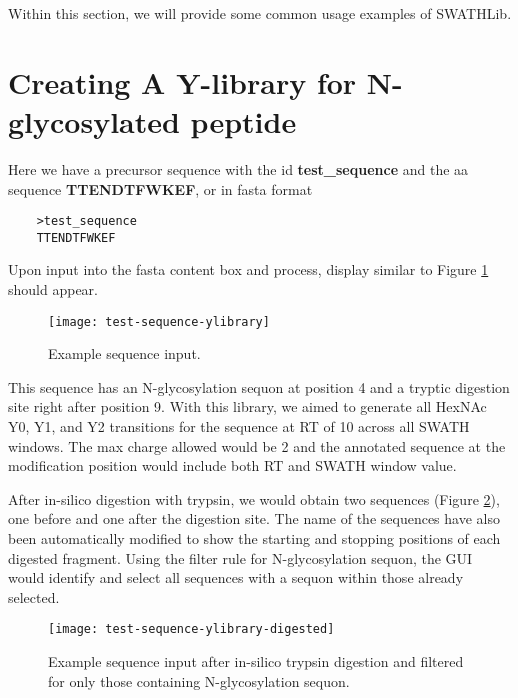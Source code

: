 \documentclass[../manual.tex]{subfiles}
\begin{document}
Within this section, we will provide some common usage examples of SWATHLib.

\section{Creating A Y-library for N-glycosylated peptide}
Here we have a precursor sequence with the id \textbf{test\_sequence} and the aa sequence \textbf{TTENDTFWKEF}, or in fasta format \par
\begin{verbatim}
	>test_sequence
	TTENDTFWKEF
\end{verbatim}

Upon input into the fasta content box and process, display similar to Figure \ref{fig:testsequenceylibrary} should appear.

\begin{figure}[H]
	\centering
	\begin{framed}
        \centering
        \begin{adjustbox}{width=1\textwidth}
			\texttt{[image: test-sequence-ylibrary]}
		\end{adjustbox}
		\caption{Example sequence input.}\label{fig:testsequenceylibrary}
	\end{framed}
\end{figure}


This sequence has an N-glycosylation sequon at position 4 and a tryptic digestion site right after position 9. With this library, we aimed to generate all HexNAc Y0, Y1, and Y2 transitions for the sequence at RT of 10 across all SWATH windows. The max charge allowed would be 2 and the annotated sequence at the modification position would include both RT and SWATH window value.\par


After in-silico digestion with trypsin, we would obtain two sequences (Figure \ref{fig:testsequenceylibrarydigested}), one before and one after the digestion site. The name of the sequences have also been automatically modified to show the starting and stopping positions of each digested fragment. Using the filter rule for N-glycosylation sequon, the GUI would identify and select all sequences with a sequon within those already selected.
\begin{figure}[H]
	\centering
	\begin{framed}
        \centering
        \begin{adjustbox}{width=1\textwidth}
			\texttt{[image: test-sequence-ylibrary-digested]}
		\end{adjustbox}
		\caption{Example sequence input after in-silico trypsin digestion and filtered for only those containing N-glycosylation sequon.}\label{fig:testsequenceylibrarydigested}
	\end{framed}
\end{figure}
\end{document}
